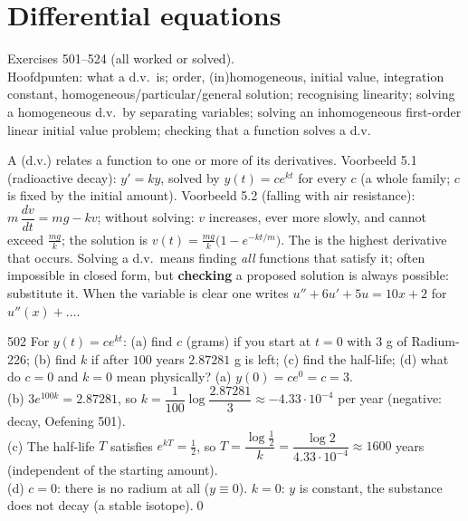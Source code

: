 \chapter{Differential equations}
%
{Exercises 501--524 (all worked or solved).\\ Hoofdpunten: what a d.v.\ is; order, (in)homogeneous, initial value, integration constant, homogeneous/particular/general solution; recognising linearity; solving a homogeneous d.v.\ by separating variables; solving an inhomogeneous first-order linear initial value problem; checking that a function solves a d.v.}

\begin{key}
A  (d.v.) relates a function to one or more of its derivatives. Voorbeeld 5.1 (radioactive decay): $y'=ky$, solved by $y(t)=ce^{kt}$ for every $c$ (a whole family; $c$ is fixed by the initial amount). Voorbeeld 5.2 (falling with air resistance): $m\,\dfrac{dv}{dt}=mg-kv$; without solving: $v$ increases, ever more slowly, and cannot exceed $\frac{mg}k$; the solution is $v(t)=\frac{mg}k\big(1-e^{-kt/m}\big)$. The  is the highest derivative that occurs. Solving a d.v.\ means finding \emph{all} functions that satisfy it; often impossible in closed form, but \textbf{checking} a proposed solution is always possible: substitute it. When the variable is clear one writes $u''+6u'+5u=10x+2$ for $u''(x)+\dots$.
\end{key}

\begin{bookex}{502}
For $y(t)=ce^{kt}$: (a) find $c$ (grams) if you start at $t=0$ with $3$ g of Radium-226; (b) find $k$ if after $100$ years $2.87281$ g is left; (c) find the half-life; (d) what do $c=0$ and $k=0$ mean physically?
\solution
(a) $y(0)=ce^0=c=3$.\\
(b) $3e^{100k}=2.87281$, so $k=\dfrac1{100}\log\dfrac{2.87281}3\approx-4.33\cdot10^{-4}$ per year (negative: decay, Oefening 501).\\
(c) The half-life $T$ satisfies $e^{kT}=\frac12$, so $T=\dfrac{\log\frac12}k=\dfrac{\log2}{4.33\cdot10^{-4}}\approx1600$ years (independent of the starting amount).\\
(d) $c=0$: there is no radium at all ($y\equiv0$). $k=0$: $y$ is constant, the substance does not decay (a stable isotope).\qed
\end{bookex}

